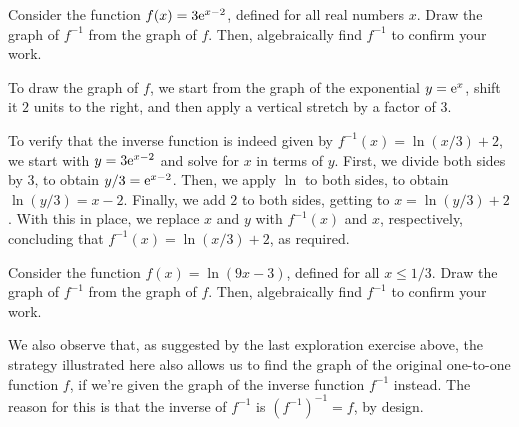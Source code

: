 \documentclass[nooutcomes]{ximera}
\begin{document}
\begin{example}
  Consider the function $f(x) = 3{\rm e}^{x-2}$, defined for all real numbers $x$. Draw the graph of $f^{-1}$ from the graph of $f$. Then, algebraically find $f^{-1}$ to confirm your work.
  
  \begin{explanation}
    To draw the graph of $f$, we start from the graph of the exponential $y={\rm e}^x$, shift it $2$ units to the right, and then apply a vertical stretch by a factor of $3$.

    \begin{image}
    \end{image}

  To verify that the inverse function is indeed given by $f^{-1}(x) = \ln(x/3)+2$, we start with $y=3{\rm e}^{x-2}$ and solve for $x$ in terms of $y$. First, we divide both sides by $3$, to obtain $y/3 = {\rm e}^{x-2}$. Then, we apply $\ln$ to both sides, to obtain $\ln (y/3) = x-2$. Finally, we add $2$ to both sides, getting to $x = \ln(y/3)+2$. With this in place, we replace $x$ and $y$ with $f^{-1}(x)$ and $x$, respectively, concluding that $f^{-1}(x) = \ln(x/3)+2$, as required.    
  \end{explanation}
\end{example}

\begin{exploration}
  Consider the function $f(x) = \ln(9x-3)$, defined for all $x\leq 1/3$. Draw the graph of $f^{-1}$ from the graph of $f$. Then, algebraically find $f^{-1}$ to confirm your work.
\end{exploration}

We also observe that, as suggested by the last exploration exercise above, the strategy illustrated here also allows us to find the graph of the original one-to-one function $f$, if we're given the graph of the inverse function $f^{-1}$ instead. The reason for this is that the inverse of $f^{-1}$ is $(f^{-1})^{-1} = f$, by design.
\end{document}
